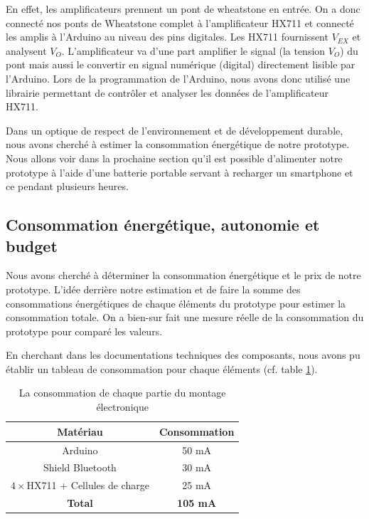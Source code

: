 \documentclass{polytech/polytech}
\begin{document}
 En effet, les amplificateurs prennent un pont de wheatstone en entrée. On a donc connecté nos ponts de Wheatstone complet à l'amplificateur HX711 et connecté les amplis à l'Arduino au niveau des pins digitales. Les HX711 fournissent $V_{EX}$ et analysent $V_O$. L'amplificateur va d'une part amplifier le signal (la tension $V_O$) du pont mais aussi le convertir en signal numérique (digital) directement lisible par l'Arduino. Lors de la programmation de l'Arduino, nous avons donc utilisé une librairie permettant de contrôler et analyser les données de l'amplificateur HX711.
 
 Dans un optique de respect de l'environnement et de développement durable, nous avons cherché à estimer la consommation énergétique de notre prototype. Nous allons voir dans la prochaine section qu'il est possible d'alimenter notre prototype à l'aide d'une batterie portable servant à recharger un smartphone et ce pendant plusieurs heures.

\subsection{Consommation énergétique, autonomie et budget}

Nous avons cherché à déterminer la consommation énergétique et le prix de notre prototype.
L'idée derrière notre estimation et de faire la somme des consommations énergétiques de chaque éléments du prototype pour estimer la consommation totale. On a bien-sur fait une mesure réelle de la consommation du prototype pour comparé les valeurs.

En cherchant dans les documentations techniques des composants, nous avons pu établir un tableau de consommation pour chaque éléments (cf. table \ref{tab:consommation}).

\begin{table}
\begin{center}
\begin{tabular}{| c | c |}
\hline
\textbf{Matériau} & \textbf{Consommation} \\\hline\hline
Arduino & 50 mA \\\hline
Shield Bluetooth & 30 mA \\\hline
$4 \times$HX711 + Cellules de charge & 25 mA \\\hline
\textbf{Total} &  \textbf{105 mA} \\\hline
\end{tabular}
\end{center}
\caption{La consommation de chaque partie du montage électronique}
\label{tab:consommation}
\end{table}
\end{document}
